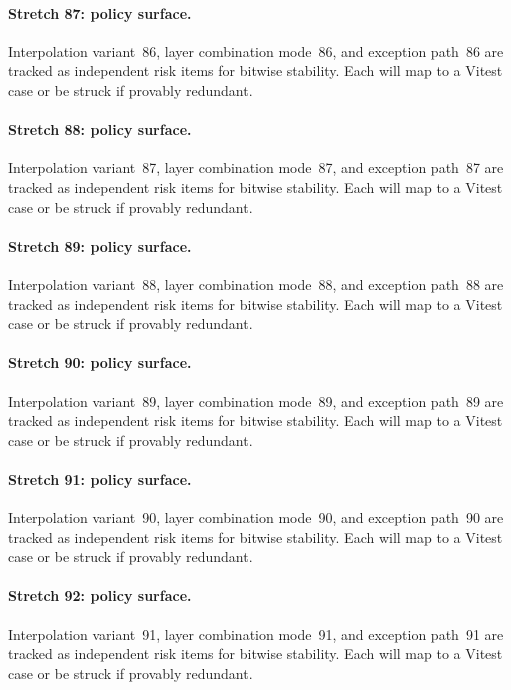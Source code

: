 \documentclass[sigconf,nonacm]{acmart}
\begin{document}
\paragraph{Stretch 87: policy surface.}
Interpolation variant~86, layer combination mode~86, and exception path~86 are tracked as independent risk items for bitwise stability. Each will map to a Vitest case or be struck if provably redundant. %

\paragraph{Stretch 88: policy surface.}
Interpolation variant~87, layer combination mode~87, and exception path~87 are tracked as independent risk items for bitwise stability. Each will map to a Vitest case or be struck if provably redundant. %

\paragraph{Stretch 89: policy surface.}
Interpolation variant~88, layer combination mode~88, and exception path~88 are tracked as independent risk items for bitwise stability. Each will map to a Vitest case or be struck if provably redundant. %

\paragraph{Stretch 90: policy surface.}
Interpolation variant~89, layer combination mode~89, and exception path~89 are tracked as independent risk items for bitwise stability. Each will map to a Vitest case or be struck if provably redundant. %

\paragraph{Stretch 91: policy surface.}
Interpolation variant~90, layer combination mode~90, and exception path~90 are tracked as independent risk items for bitwise stability. Each will map to a Vitest case or be struck if provably redundant. %

\paragraph{Stretch 92: policy surface.}
Interpolation variant~91, layer combination mode~91, and exception path~91 are tracked as independent risk items for bitwise stability. Each will map to a Vitest case or be struck if provably redundant. %
\end{document}
